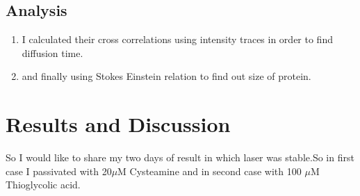 \documentclass[twoside,single]{lion-msc}
\begin{document}
   \section{Analysis}
   \begin{enumerate}[I]
   \item I calculated their cross correlations using intensity traces in order to find diffusion time.
   \item and finally using Stokes Einstein relation to find out size of protein.
    \end{enumerate}
  
\chapter{Results and Discussion}

So I would like to share my two days of result in which laser was stable.So in first case I passivated with 20$\mu$M Cysteamine and in second case with 100 $\mu$M Thioglycolic acid.
\end{document}
